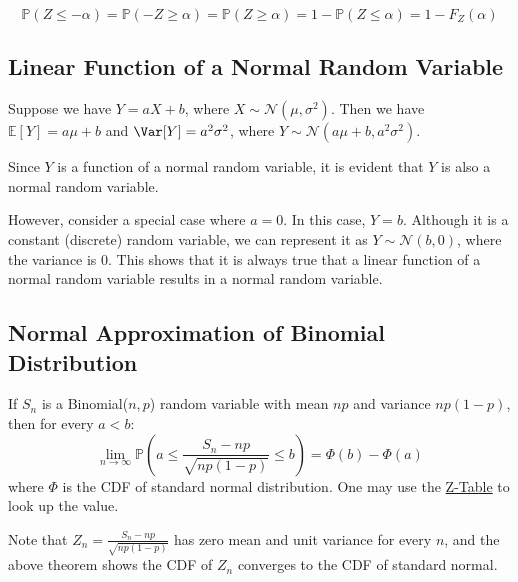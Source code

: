 \begin{remark}
    \[
    \mathbb{P}(Z \leq -\alpha) = \mathbb{P}(-Z \geq \alpha) = \mathbb{P}(Z \geq \alpha) = 1 - \mathbb{P}(Z \leq \alpha) = 1 - F_Z(\alpha)
\]
\end{remark}

\subsection{Linear Function of a Normal Random Variable}
Suppose we have \(Y = aX + b\), where \(X \sim \mathcal{N}(\mu, \sigma^2)\). Then we have \(\mathbb{E}[Y] = a\mu + b\) and \(\Var[Y] = a^2\sigma^2\), where \(Y \sim \mathcal{N}(a\mu + b, a^2\sigma^2)\). 

Since \(Y\) is a function of a normal random variable, it is evident that \(Y\) is also a normal random variable.

However, consider a special case where \(a = 0\). In this case, \(Y = b\). Although it is a constant (discrete) random variable, we can represent it as \(Y \sim \mathcal{N}(b, 0)\), where the variance is 0. This shows that it is always true that a linear function of a normal random variable results in a normal random variable.

\subsection{Normal Approximation of Binomial Distribution}
\begin{theorem}
    If \(S_n\) is a Binomial(\(n, p\)) random variable with mean \(np\) and variance \(np(1 - p)\), then for every \(a < b\): 
    \[
        \lim_{n \to \infty} \mathbb{P}\left(a \leq  \dfrac{S_n - np}{\sqrt{np(1 - p)}} \leq  b\right) = \varPhi (b) - \varPhi (a)
    \]
    where \(\varPhi\) is the CDF of standard normal distribution. One may use the \href{page=52}{Z-Table} to look up the value. 
    \begin{remark}
        Note that \(Z_n = \frac{S_n - np}{\sqrt{np(1 - p)}}\) has zero mean and unit variance for every \(n\), and the above theorem shows the CDF of \(Z_n\) converges to the CDF of standard normal. 
    \end{remark}
\end{theorem}

